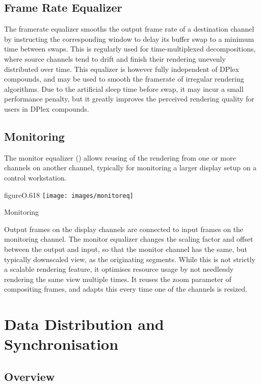 \section{Frame Rate Equalizer}\label{sFramerateEq}

The framerate equalizer smooths the output frame rate of a destination channel
by instructing the corresponding window to delay its buffer swap to a minimum
time between swaps. This is regularly used for time-multiplexed decompositions,
where source channels tend to drift and finish their rendering unevenly
distributed over time. This equalizer is however fully independent of DPlex
compounds, and may be used to smooth the framerate of irregular rendering
algorithms. Due to the artificial sleep time before swap, it may incur a small
performance penalty, but it greatly improves the perceived rendering quality for
users in DPlex compounds.

\section{Monitoring}

The monitor equalizer () allows reusing of the rendering from one
or more channels on another channel, typically for monitoring a larger display
setup on a control workstation.

\begin{wrapfloat}{figure}{O}{.618\textwidth}
  \texttt{[image: images/monitoreq]}
  \caption{\label{fmonitor}Monitoring}
\end{wrapfloat}

Output frames on the display channels are connected to input frames on the
monitoring channel. The monitor equalizer changes the scaling factor and offset
between the output and input, so that the monitor channel has the same, but
typically downscaled view, as the originating segments. While this is not
strictly a scalable rendering feature, it optimises resource usage by not
needlessly rendering the same view multiple times. It reuses the zoom parameter
of compositing frames, and adapts this every time one of the channels is
resized.


\chapter{Data Distribution and Synchronisation}\label{sCollage}

\section{Overview}

